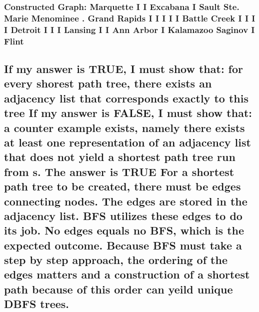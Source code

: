 \documentclass{article}
\begin{document}
\setcounter{section}{9}
\setcounter{subsection}{4}
\setcounter{subsubsection}{0}
\subsubsection{
Constructed Graph:\newline
Marquette\newline
I   I  Excabana\newline
I   Sault Ste. Marie\newline
Menominee\newline
.\newline
Grand Rapids \newline
I I I I I Battle Creek\newline
I I I I Detroit\newline
I I I Lansing\newline
I I Ann Arbor\newline
I Kalamazoo\newline
Saginov\newline
 I\newline
 Flint
}

\newpage

\setcounter{section}{1}
\setcounter{subsection}{2}
\subsection{
If my answer is TRUE, I must show that: for every shorest path tree, there exists an adjacency list that corresponds exactly to this tree\newline
If my answer is FALSE, I must show that: a counter example exists, namely there exists at least one representation of an adjacency list that does not yield a shortest path tree run from s.\newline
The answer is TRUE\newline
For a shortest path tree to be created, there must be edges connecting nodes. The edges are stored in the adjacency list. BFS utilizes these edges to do its job. No edges equals no BFS, which is the expected outcome. Because BFS must take a step by step approach, the ordering of the edges matters and a construction of a shortest path because of this order can yeild unique DBFS trees.
}

\newpage

\setcounter{section}{2}
\setcounter{subsection}{0}
\end{document}
